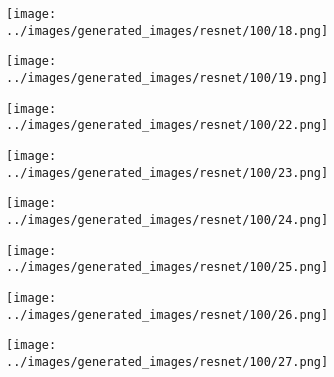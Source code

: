 \begin{figure}[H]
\hspace{1em}%
\begin{subfigure}[b]{0.1\textwidth}
 \centering
 \texttt{[image: ../images/generated\_images/resnet/100/18.png]}
\end{subfigure}
\hspace{1em}%
\begin{subfigure}[b]{0.1\textwidth}
 \centering
 \texttt{[image: ../images/generated\_images/resnet/100/19.png]}
\end{subfigure}
\hspace{1em}%
\begin{subfigure}[b]{0.1\textwidth}
 \centering
 \texttt{[image: ../images/generated\_images/resnet/100/22.png]}
\end{subfigure}
\hspace{1em}%
\begin{subfigure}[b]{0.1\textwidth}
 \centering
 \texttt{[image: ../images/generated\_images/resnet/100/23.png]}
\end{subfigure}
\hspace{1em}%
\begin{subfigure}[b]{0.1\textwidth}
 \centering
 \texttt{[image: ../images/generated\_images/resnet/100/24.png]}
\end{subfigure}
\hspace{1em}%
\begin{subfigure}[b]{0.1\textwidth}
\centering
\texttt{[image: ../images/generated\_images/resnet/100/25.png]}
\end{subfigure}
\hspace{1em}%
\begin{subfigure}[b]{0.1\textwidth}
 \centering
 \texttt{[image: ../images/generated\_images/resnet/100/26.png]}
\end{subfigure}
\hspace{1em}%
\begin{subfigure}[b]{0.1\textwidth}
 \centering
 \texttt{[image: ../images/generated\_images/resnet/100/27.png]}
\end{subfigure}
\hspace{1em}%
\begin{subfigure}[b]{0.1\textwidth}

\end{subfigure}
\end{figure}
